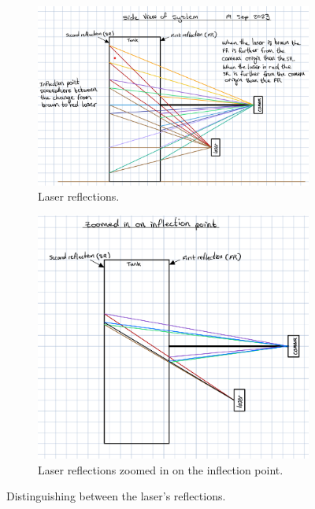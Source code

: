 \begin{figure}[h]
    \centering
    \begin{subfigure}[t]{0.45\textwidth}
        \includegraphics[width=\linewidth]{figures/distinguish_lasers.png}
        \caption{Laser reflections.}
    \end{subfigure}
    \quad
    \begin{subfigure}[t]{0.45\textwidth}
        \includegraphics[width=\linewidth]{figures/distinguish_lasers_zoomed_inflection.png}
        \caption{Laser reflections zoomed in on the inflection point.}
    \end{subfigure}
    \caption{Distinguishing between the laser's reflections.}
    \label{fig:distinguish_lasers}
\end{figure}



